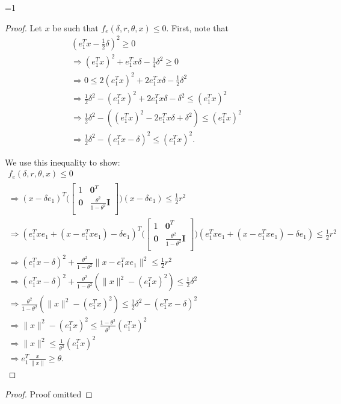 \documentclass{article}
\theoremstyle{case}
\def\includeproofs{1}
\begin{document}
\ifnum\includeproofs=1
\begin{proof}
Let $x$ be such that $f_e(\delta, r, \theta, x) \le 0$.
First, note that
\begin{align*}
(e_1^Tx - \frac 1 2 \delta )^2\ge 0\\
\Longrightarrow (e_1^Tx)^2 + e_1^Tx\delta  - \frac 1 4 \delta^2 \ge 0\\
\Longrightarrow 0 \le 2(e_1^Tx)^2 + 2e_1^Tx\delta  - \frac 1 2 \delta^2\\
\Longrightarrow \frac 1 2 \delta^2 - (e_1^Tx)^2 + 2e_1^Tx\delta - \delta^2 \le (e_1^Tx)^2 \\
\Longrightarrow \frac 1 2 \delta^2 - \left((e_1^Tx)^2 - 2e_1^Tx\delta + \delta^2\right) \le (e_1^Tx)^2 \\
\Longrightarrow \frac 1 2 \delta^2 - (e_1^Tx - \delta)^2 \le (e_1^Tx)^2.
\end{align*}

We use this inequality to show:
\begin{align*}
f_e(\delta, r, \theta, x) \le 0 \\
\Longrightarrow (x - \delta e_1)^T\bigg(\begin{bmatrix}
1 & \boldsymbol0^T \\
\boldsymbol 0 & \frac{\theta^2}{1 - \theta^2} \boldsymbol I \\
\end{bmatrix}\bigg)(x - \delta e_1) \le \frac 1 2 r^2 \\
\Longrightarrow (e_1^Txe_1 + (x - e_1^Txe_1) - \delta e_1)^T\bigg(\begin{bmatrix}
1 & \boldsymbol0^T \\
\boldsymbol 0 & \frac{\theta^2}{1 - \theta^2} \boldsymbol I \\
\end{bmatrix}\bigg)(e_1^Txe_1 + (x - e_1^Txe_1) - \delta e_1) \le \frac 1 2 r^2 \\
\Longrightarrow
(e_1^Tx - \delta)^2 + \frac{\theta^2}{1 - \theta^2}\|x - e_1^Tx e_1\|^2 \le \frac 1 2 r^2 \\
\Longrightarrow
(e_1^Tx - \delta)^2 + \frac{\theta^2}{1 - \theta^2}(\|x\|^2 - (e_1^Tx)^2) \le \frac 1 2 \delta^2 \\
\Longrightarrow\frac{\theta^2}{1 - \theta^2}(\|x\|^2 - (e_1^Tx)^2) \le \frac 1 2 \delta^2 - (e_1^Tx - \delta)^2\\
\Longrightarrow\|x\|^2 - (e_1^Tx)^2 \le \frac{1 - \theta^2}{\theta^2}(e_1^Tx)^2 \\
\Longrightarrow\|x\|^2 \le \frac 1 {\theta^2}(e_1^Tx)^2 \\
\Longrightarrow e_1^T\frac{x}{\|x\|} \ge \theta.
\end{align*}
\end{proof}
\else
\begin{proof}
Proof omitted
\end{proof}
\fi
\end{document}
